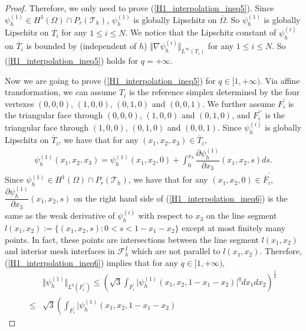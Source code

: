 \documentclass[12pt]{amsart}
\theoremstyle{definition}
\theoremstyle{remark}
\begin{document}
\begin{proof}
Therefore, we only need to prove (\ref{H1_interpolation_ineq5}). Since $\psi_{h}^{(1)} \in H^{1}(\Omega)\cap 
P_{r}(\mathcal{T}_{h})$, $\psi_{h}^{(1)}$ is globally Lipschitz on $\overline{\Omega}$. So 
$\psi_{h}^{(1)}$ is globally Lipschitz on $\overline{T_{i}}$ for any $1\leq i \leq N$. 
We notice that the Lipschitz constant of $\psi_{h}^{(i)}$ on $\overline{T}_{i}$ is bounded by 
(independent of $h$) $\Vert \nabla \psi_{h}^{(i)} \Vert_{L^{\infty}(T_{i})}$ for any $1\leq i \leq N$. 
So (\ref{H1_interpolation_ineq5}) holds for $q = + \infty$. 

Now we are going to prove (\ref{H1_interpolation_ineq5}) for $q \in [1,+\infty)$. Via affine transformation, 
we can assume $T_{i}$ is the reference simplex determined by the four vertexes 
$(0,0,0)$, $(1,0,0)$, $(0,1,0)$ and $(0,0,1)$.
We further assume $F_{i}^{\prime}$ is the triangular face through $(0,0,0)$, $(1,0,0)$ and $(0,1,0)$, 
and $F_{i}^{\prime\prime}$ is the triangular face through $(1,0,0)$, $(0,1,0)$ and $(0,0,1)$. 
Since $\psi_{h}^{(i)}$ is globally Lipschitz on $\overline{T}_{i}$, we have that for any $(x_{1},x_{2},x_{3})
\in \overline{T}_{i}$, 
\begin{align}
\label{H1_interpolation_ineq6}
\psi_{h}^{(1)}(x_{1},x_{2},x_{3}) = \psi_{h}^{(1)}(x_{1},x_{2},0) 
+ \int_{0}^{x_{3}} \dfrac{\partial \psi_{h}^{(1)}}{\partial x_{3}}(x_{1},x_{2},s) ds.
\end{align}
Since $\psi_{h}^{(1)} \in H^{1}(\Omega)\cap P_{r}(\mathcal{T}_{h})$, we have that for any 
$(x_{1},x_{2},0) \in \overline{F}_{i}^{\prime}$, $\dfrac{\partial \psi_{h}^{(1)}}{\partial x_{3}}(x_{1},x_{2},s)$ 
on the right hand side of (\ref{H1_interpolation_ineq6}) is the same as the weak derivative of 
$\psi_{h}^{(i)}$ with respect to $x_{3}$ on the line segment $l(x_{1},x_{2}):=\{ (x_{1},x_{2},s): 0< s < 1 - x_{1} - x_{2} \}$ 
except at most finitely many points. In fact, these points are intersections between the line segment $l(x_{1},x_{2})$ 
and interior mesh interfaces in $\mathcal{F}_{h}^{I}$ which are not parallel to $l(x_{1},x_{2})$.  
Therefore, (\ref{H1_interpolation_ineq6}) implies that for any $q \in [1,+\infty)$, 
\begin{align}
\label{H1_interpolation_ineq7}
& \Vert \psi_{h}^{(1)} \Vert_{L^{q}(F_{i}^{\prime\prime})} \leq  
\left(\sqrt{3} \int_{F_{i}^{\prime}} \vert \psi_{h}^{(1)}(x_{1},x_{2},1-x_{1}-x_{2}) \vert^{q}dx_{1}dx_{2} 
\right)^{\frac{1}{q}} \\ 
\nonumber 
\leq & \sqrt{3} \left(\int_{F_{i}^{\prime}} \vert \psi_{h}^{(1)}(x_{1},x_{2},1-x_{1}-x_{2}) 

\end{align}
\end{proof}
\end{document}
